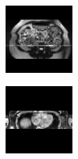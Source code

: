 \begin{figure}[htb]
\begin{subfigure}[b]{0.25\textwidth}
                \includegraphics[width=.95\linewidth]{img_hyperopt/Abdomen_1050}
        \end{subfigure}%
        \begin{subfigure}[b]{0.25\textwidth}
                \centering
                \includegraphics[width=.95\linewidth]{img_hyperopt/Abdomen_5115}

\end{subfigure}
\end{figure}

